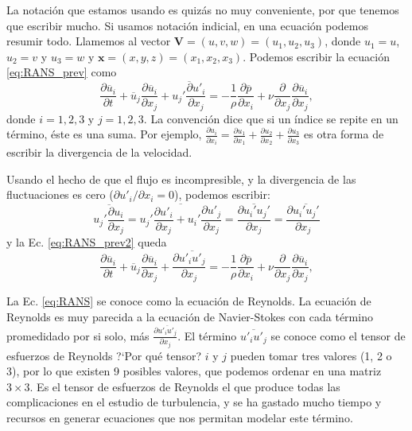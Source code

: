 La notación que estamos usando es quizás no muy conveniente, por que tenemos que escribir mucho.
Si usamos notación indicial, en una ecuación podemos resumir todo. 
Llamemos al vector $\mathbf{V} = (u,v,w) = (u_1,u_2,u_3)$, donde $u_1=u$, $u_2=v$ y $u_3=w$ y $\mathbf{x} = (x,y,z) = (x_1,x_2,x_3)$.
Podemos escribir la ecuación \eqref{eq:RANS_prev} como
%
\begin{equation}\label{eq:RANS_prev2}
\frac{\partial \overline{u}_i}{\partial t} + \overline{u}_j\frac{\partial \overline{u}_i}{\partial x_j} + \overline{u_j'\frac{\partial u'_i}{\partial x_j}} = -\frac{1}{\rho}\frac{\partial \overline{p}}{\partial x_i} + \nu \frac{\partial}{\partial x_j}\frac{\partial \overline{u}_i}{\partial x_j},
\end{equation}
%
donde $i=1,2,3$ y $j=1,2,3$. 
La convención dice que si un índice se repite en un término, éste es una suma.
Por ejemplo, $\frac{\partial u_i}{\partial x_i}=\frac{\partial u_1}{\partial x_1} + \frac{\partial u_2}{\partial x_2} + \frac{\partial u_3}{\partial x_3}$ es otra forma de escribir la divergencia de la velocidad.

Usando el hecho de que el flujo es incompresible, y la divergencia de las fluctuaciones es cero ($\partial u'_i/\partial x_i=0$), podemos escribir:
%
\begin{equation}
\overline{u_j'\frac{\partial u_i}{\partial x_j}} = \overline{u_j'\frac{\partial u'_i}{\partial x_j} + u_i'\frac{\partial u'_j}{\partial x_j}} = \overline{\frac{\partial u_i'u_j'}{\partial x_j}} = \frac{\partial \overline{u_i'u_j'}}{\partial x_j}
\end{equation}
%
y la Ec. \eqref{eq:RANS_prev2} queda
%
\begin{equation}\label{eq:RANS}
\frac{\partial \overline{u}_i}{\partial t} + \overline{u}_j\frac{\partial \overline{u}_i}{\partial x_j} + \frac{\partial \overline{u'_iu'_j}}{\partial x_j} = -\frac{1}{\rho}\frac{\partial \overline{p}}{\partial x_i} + \nu \frac{\partial}{\partial x_j}\frac{\partial \overline{u}_i}{\partial x_j},
\end{equation}

La Ec. \eqref{eq:RANS} se conoce como la ecuación de Reynolds.
La ecuación de Reynolds es muy parecida a la ecuación de Navier-Stokes con cada término promedidado por si solo, más $\frac{\partial \overline{u'_iu'_j}}{\partial x_j}$.
El término $\overline{u'_iu'_j}$ se conoce como el tensor de esfuerzos de Reynolds \mbox{?`}Por qué tensor? $i$ y $j$ pueden tomar tres valores (1, 2 o 3), por lo que existen 9 posibles valores, que podemos ordenar en una matriz $3\times 3$.
Es el tensor de esfuerzos de Reynolds el que produce todas las complicaciones en el estudio de turbulencia, y se ha gastado mucho tiempo y recursos en generar ecuaciones que nos permitan modelar este término.

